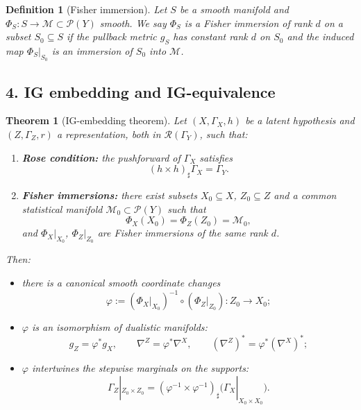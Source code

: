 \documentclass[11pt]{article}
\newtheorem{definition}{Definition}
\newtheorem{theorem}{Theorem}
\newcommand{\Pcal}{\mathcal{P}}
\newcommand{\push}{\sharp}     %
\begin{document}
\begin{definition}[Fisher immersion]
Let $S$ be a smooth manifold and $\Phi_S:S\to\mathcal M\subset\Pcal(Y)$
smooth. We say $\Phi_S$ is a \emph{Fisher immersion of rank $d$} on a
subset $S_0\subseteq S$ if the pullback metric $g_S$ has constant rank $d$
on $S_0$ and the induced map $\Phi_S|_{S_0}$ is an immersion of $S_0$ into
$\mathcal M$.
\end{definition}

\subsection*{4. IG embedding and IG-equivalence}

\begin{theorem}[IG-embedding theorem]
\label{thm:ig-embedding-early}
Let $(X,\Gamma_X,h)$ be a latent hypothesis and $(Z,\Gamma_Z,r)$ a
representation, both in $\mathcal R(\Gamma_Y)$, such that:

\begin{enumerate}[leftmargin=1.8em]
  \item \textbf{Rose condition:} the pushforward of $\Gamma_X$ satisfies
  \[
    (h\times h)_{\push}\Gamma_X = \Gamma_Y.
  \]
  \item \textbf{Fisher immersions:} there exist subsets $X_0\subseteq X$,
  $Z_0\subseteq Z$ and a common statistical manifold
  $\mathcal M_0\subset \Pcal(Y)$ such that
  \[
    \Phi_X(X_0) = \Phi_Z(Z_0) = \mathcal M_0,
  \]
  and $\Phi_X|_{X_0}$, $\Phi_Z|_{Z_0}$ are Fisher immersions of the same
  rank $d$.
\end{enumerate}

Then:
\begin{itemize}[leftmargin=1.5em]
  \item there is a canonical smooth coordinate changes
  \[
    \varphi := (\Phi_X|_{X_0})^{-1}\circ(\Phi_Z|_{Z_0}) : Z_0\to X_0;
  \]
  \item $\varphi$ is an isomorphism of dualistic manifolds:
  \[
    g_Z = \varphi^\ast g_X,
    \qquad
    \nabla^Z = \varphi^\ast \nabla^X,
    \qquad
    (\nabla^Z)^\ast = \varphi^\ast (\nabla^X)^\ast;
  \]
  \item $\varphi$ intertwines the stepwise marginals on the supports:
  \[
    \Gamma_Z|_{Z_0\times Z_0}
    = (\varphi^{-1}\times\varphi^{-1})_{\push}
      \bigl(\Gamma_X|_{X_0\times X_0}\bigr).
  \]
\end{itemize}
\end{theorem}
\end{document}
